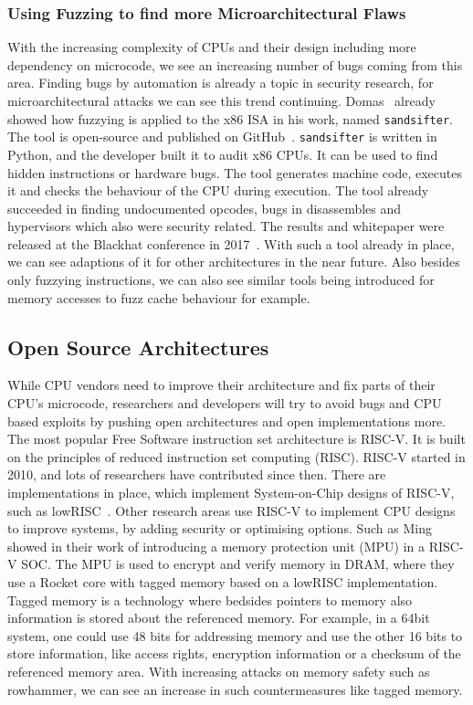 \subsubsection{Using Fuzzing to find more Microarchitectural Flaws}

With the increasing complexity of CPUs and their design including more
dependency on microcode, we see an increasing number of bugs coming from this
area. Finding bugs by automation is already a topic in security research, for
microarchitectural attacks we can see this trend continuing.
Domas~\cite{sandsifter} already showed how fuzzying is applied to the x86 ISA in
his work, named \texttt{sandsifter}. The tool is open-source and published on
GitHub~\cite{sandsifterurl}. \texttt{sandsifter} is written in Python, and the
developer built it to audit x86 CPUs. It can be used to find hidden instructions
or hardware bugs. The tool generates machine code, executes it and checks the
behaviour of the CPU during execution. The tool already succeeded in finding
undocumented opcodes, bugs in disassembles and hypervisors which also were
security related. The results and whitepaper were released at the Blackhat
conference in 2017~\cite{sandsifter}. With such a tool already in place, we can
see adaptions of it for other architectures in the near future. Also besides
only fuzzying instructions, we can also see similar tools being introduced for
memory accesses to fuzz cache behaviour for example.

\subsection{Open Source Architectures}

While CPU vendors need to improve their architecture and fix parts of their
CPU's microcode, researchers and developers will try to avoid bugs and CPU based
exploits by pushing open architectures and open implementations more. The most
popular Free Software instruction set architecture is RISC-V. It is built on the
principles of reduced instruction set computing (RISC). RISC-V started in 2010,
and lots of researchers have contributed since then. There are implementations
in place, which implement System-on-Chip designs of RISC-V, such as
lowRISC~\cite{lowrisc}. Other research areas use RISC-V  to implement CPU
designs to improve systems, by adding security or optimising options. Such as
Ming~\etal~\cite{smarts} showed in their work of introducing a memory protection
unit (MPU) in a RISC-V SOC. The MPU is used to encrypt and verify memory in
DRAM, where they use a Rocket core with tagged memory based on a lowRISC
implementation. Tagged memory is a technology where bedsides pointers to memory
also information is stored about the referenced memory. For example, in a 64bit
system, one could use 48 bits for addressing memory and use the other 16 bits to
store information, like access rights, encryption information or a checksum of
the referenced memory area. With increasing attacks on memory safety such as
rowhammer, we can see an increase in such countermeasures like tagged memory.

